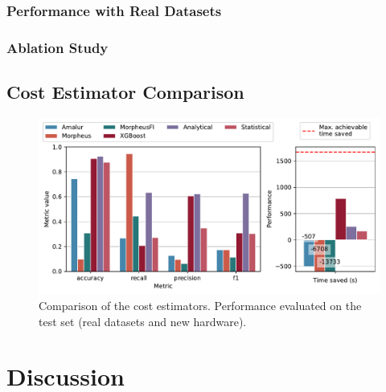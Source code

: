 \subsubsection{Performance with Real Datasets}
\label{subsubsec:6-real-datasets}

\subsubsection{Ablation Study}
\label{subsubsec:6-ablation}


\subsection{Cost Estimator Comparison}
\begin{figure}[ht]
  \centering
  \includegraphics[width=\linewidth]{chapters/06_evaluation/figures/eval_sota_results.pdf}
  \caption{Comparison of the cost estimators. Performance evaluated on the test set (real datasets and new hardware). }
  \label{fig:6-sota-comparison}
\end{figure}

\section{Discussion}
\label{sec:eval-discussion}

